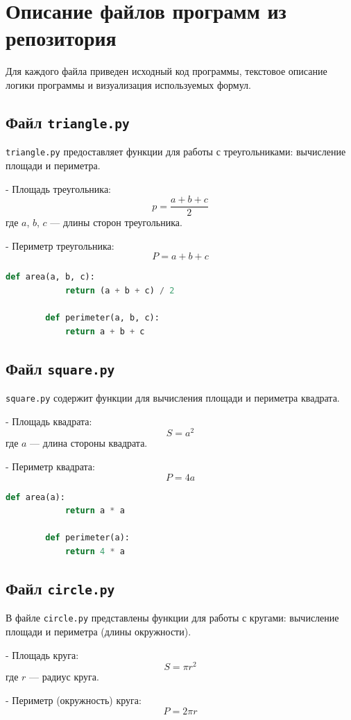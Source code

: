 \documentclass[a4paper, 14pt]{extarticle}
\begin{document}
	\section{Описание файлов программ из репозитория}
	Для каждого файла приведен исходный код программы, текстовое описание логики программы и визуализация используемых формул.
	
	\subsection{Файл \texttt{triangle.py}}
	\texttt{triangle.py} предоставляет функции для работы с треугольниками: вычисление площади и периметра.
	
	- Площадь треугольника:
	\[
	p = \frac{a + b + c}{2}
	\]
	где \( a \), \( b \), \( c \) — длины сторон треугольника.
	
	- Периметр треугольника:
	\[
	P = a + b + c
	\]
	
	\begin{lstlisting}[language=Python]
		def area(a, b, c):
			return (a + b + c) / 2
		
		def perimeter(a, b, c):
			return a + b + c
	\end{lstlisting}
	
	\subsection{Файл \texttt{square.py}}
	\texttt{square.py} содержит функции для вычисления площади и периметра квадрата.
	
	- Площадь квадрата:
	\[ 
	S = a^2 
	\]
	где \( a \) — длина стороны квадрата.
	
	- Периметр квадрата:
	\[ 
	P = 4a 
	\]
	
	\begin{lstlisting}[language=Python]
		def area(a):
			return a * a
		
		def perimeter(a):
			return 4 * a
	\end{lstlisting}
	
	\subsection{Файл \texttt{circle.py}}
	В файле \texttt{circle.py} представлены функции для работы с кругами: вычисление площади и периметра (длины окружности).
	
	- Площадь круга:
	\[ 
	S = \pi r^2 
	\]
	где \( r \) — радиус круга.
	
	- Периметр (окружность) круга:
	\[ 
	P = 2 \pi r 
	\]
	
\end{document}
